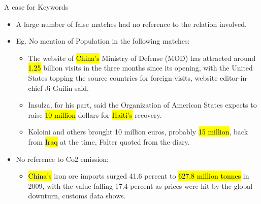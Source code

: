 \documentclass{beamer}
\makeatletter
\newcommand\SoulColor{%
  \let\set@color\beamerorig@set@color
  \let\reset@color\beamerorig@reset@color}
\makeatother
\begin{document}
\begin{frame}{A case for Keywords}
 \begin{itemize}
  \item A large number of false matches had no reference to the relation involved.
  \item Eg. No mention of Population in the following matches:
  \begin{itemize}
  \item The website of \SoulColor\hl{China's} Ministry of Defense (MOD) has attracted around \SoulColor\hl{1.25} billion visits in the three months since its opening, with the United States topping the source countries for foreign visits, website editor-in-chief Ji Guilin said.
  \item Insulza, for his part, said the Organization of American States expects to raise \SoulColor\hl{10 million} dollars for \SoulColor\hl{Haiti's} recovery.
  \item Koloini and others brought 10 million euros, probably \SoulColor\hl{15 million}, back from \SoulColor\hl{Iraq} at the time, Falter quoted from the diary.
 \end{itemize}
\item No reference to Co2 emission:
 \begin{itemize}
 \item \SoulColor\hl{China's} iron ore imports surged 41.6 percent to \SoulColor\hl{627.8 million tonnes} in 2009, with the value falling 17.4 percent as prices were hit by the global downturn, customs data shows.
 \end{itemize}
 \end{itemize}

\end{frame}
\end{document}

